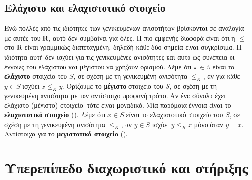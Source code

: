 \subsection{Ελάχιστο και ελαχιστοτικό στοιχείο} Ενώ πολλές από τις ιδιότητες των
γενικευμένων ανισοτήτων βρίσκονται σε αναλογία με αυτές του $\mathbf{R}$, αυτό
δεν συμβαίνει για όλες. Η πιο εμφανής διαφορά είναι ότι η $\leq$ στο
$\mathbf{R}$ είναι γραμμικώς διατεταγμένη, δηλαδή κάθε δύο σημεία είναι
συγκρίσιμα. Η ιδιότητα αυτή δεν ισχύει για τις γενικευμένες ανισότητες και αυτό
ως συνέπεια οι έννοιες του ελάχιστου και μέγιστου να χρήζουν ορισμού. Λέμε ότι
$x \in S$ είναι το \textbf{ελάχιστο} στοιχείο του $S$, σε σχέση με τη γενικευμένη
ανισότητα $\leq_K$, αν για κάθε $y \in S$ ισχύει $x \leq_K y$. Ορίζουμε το
\textbf{μέγιστο} στοιχείο του $S$, σε σχέση με τη γενικευμένη ανισότητα με τον
αντίστοιχο προφανή τρόπο. Αν ένα σύνολο έχει ελάχιστο (μέγιστο) στοιχείο, τότε
είναι μοναδικό. Μία παρόμοια έννοια είναι το \textbf{ελαχιστοτικό στοιχείο}
(\textbf{}). Λέμε ότι $x \in S$ είναι το ελαχιστοτικό
στοιχείο του $S$, σε σχέση με τη γενικευμένη ανισότητα $\leq_K$,
αν $y \in S$ ισχύει $y \leq_K x$ μόνο όταν $y = x$. Αντίστοιχα για το
\textbf{μεγιστοτικό στοιχείο} (\textbf{}).

\section{Υπερεπίπεδο διαχωριστικό και στήριξης}

